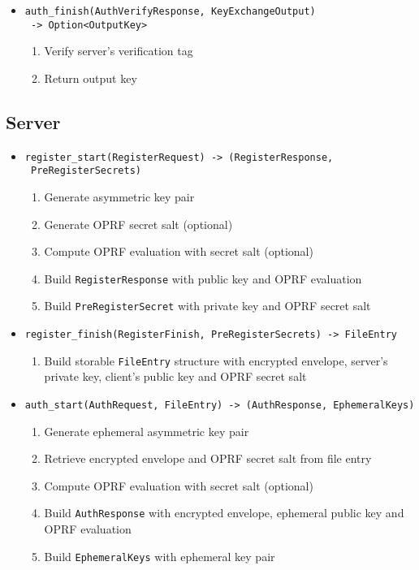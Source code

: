 \documentclass[../report.tex]{subfiles}
\begin{document}
\begin{itemize}
 \item \verb|auth_finish(AuthVerifyResponse, KeyExchangeOutput)|\\
       \verb| -> Option<OutputKey>|
  \begin{enumerate}
    \item Verify server's verification tag
    \item Return output key
  \end{enumerate}
  
\end{itemize}

\subsection{Server}
\begin{itemize}
 \item \verb|register_start(RegisterRequest) -> (RegisterResponse,|\\
       \verb| PreRegisterSecrets)|
  \begin{enumerate}
    \item Generate asymmetric key pair
    \item Generate OPRF secret salt (optional)
    \item Compute OPRF evaluation with secret salt (optional)
    \item Build \verb|RegisterResponse| with public key and OPRF evaluation
    \item Build \verb|PreRegisterSecret| with private key and OPRF secret salt
  \end{enumerate}
  
 \item \verb|register_finish(RegisterFinish, PreRegisterSecrets) -> FileEntry|
  \begin{enumerate}
    \item Build storable \verb|FileEntry| structure with encrypted envelope, server's private key, client's public key and OPRF secret salt
  \end{enumerate}
  
  
  
 \item \verb|auth_start(AuthRequest, FileEntry) -> (AuthResponse, EphemeralKeys)|
  \begin{enumerate}
    \item Generate ephemeral asymmetric key pair
    \item Retrieve encrypted envelope and OPRF secret salt from file entry
    \item Compute OPRF evaluation with secret salt (optional)
    \item Build \verb|AuthResponse| with encrypted envelope, ephemeral public key and OPRF evaluation
    \item Build \verb|EphemeralKeys| with ephemeral key pair
  \end{enumerate}
  

\end{itemize}
\end{document}
